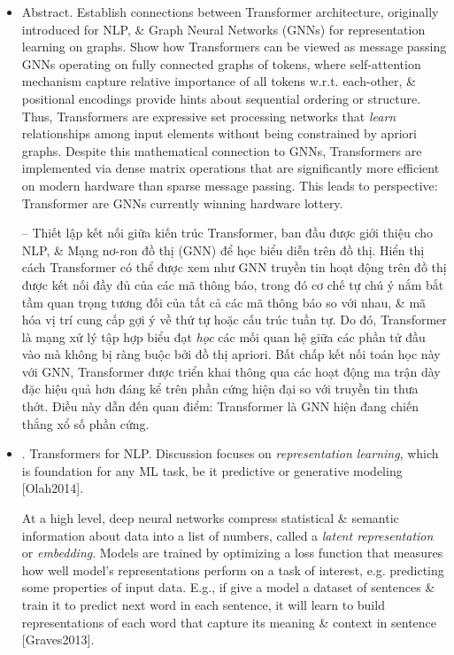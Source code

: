 \documentclass{article}
\begin{document}
\begin{itemize}
    \item {\sf Abstract.} Establish connections between Transformer architecture, originally introduced for NLP, \& Graph Neural Networks (GNNs) for representation learning on graphs. Show how Transformers can be viewed as message passing GNNs operating on fully connected graphs of tokens, where self-attention mechanism capture relative importance of all tokens w.r.t. each-other, \& positional encodings provide hints about sequential ordering or structure. Thus, Transformers are expressive set processing networks that {\it learn} relationships among input elements without being constrained by apriori graphs. Despite this mathematical connection to GNNs, Transformers are implemented via dense matrix operations that are significantly more efficient on modern hardware than sparse message passing. This leads to perspective: Transformer are GNNs currently winning hardware lottery.
    
    -- Thiết lập kết nối giữa kiến trúc Transformer, ban đầu được giới thiệu cho NLP, \& Mạng nơ-ron đồ thị (GNN) để học biểu diễn trên đồ thị. Hiển thị cách Transformer có thể được xem như GNN truyền tin hoạt động trên đồ thị được kết nối đầy đủ của các mã thông báo, trong đó cơ chế tự chú ý nắm bắt tầm quan trọng tương đối của tất cả các mã thông báo so với nhau, \& mã hóa vị trí cung cấp gợi ý về thứ tự hoặc cấu trúc tuần tự. Do đó, Transformer là mạng xử lý tập hợp biểu đạt {\it học} các mối quan hệ giữa các phần tử đầu vào mà không bị ràng buộc bởi đồ thị apriori. Bất chấp kết nối toán học này với GNN, Transformer được triển khai thông qua các hoạt động ma trận dày đặc hiệu quả hơn đáng kể trên phần cứng hiện đại so với truyền tin thưa thớt. Điều này dẫn đến quan điểm: Transformer là GNN hiện đang chiến thắng xổ số phần cứng.
    \item {. Transformers for NLP.} Discussion focuses on {\it representation learning}, which is foundation for any ML task, be it predictive or generative modeling [Olah2014].
    
    At a high level, deep neural networks compress statistical \& semantic information about data into a list of numbers, called a {\it latent representation} or {\it embedding}. Models are trained by optimizing a loss function that measures how well model's representations perform on a task of interest, e.g. predicting some properties of input data. E.g., if give a model a dataset of sentences \& train it to predict next word in each sentence, it will learn to build representations of each word that capture its meaning \& context in sentence [Graves2013].
    

\end{itemize}
\end{document}
